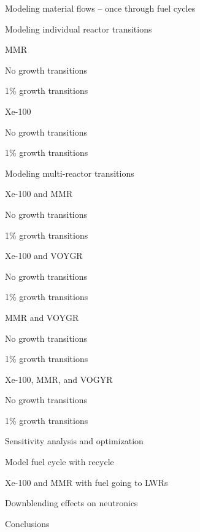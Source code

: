 \documentclass{report}
\begin{document}
\begin{outline}
\item Modeling material flows -- once through fuel cycles
\begin{outline}
    \item Modeling individual reactor transitions
    \begin{outline}
        \item MMR 
        \begin{outline}
            \item No growth transitions
            \item 1\% growth transitions
        \end{outline}
        \item Xe-100
        \begin{outline}
            \item No growth transitions
            \item 1\% growth transitions
        \end{outline}
    \end{outline}
    \item Modeling multi-reactor transitions 
    \begin{outline}
        \item Xe-100 and MMR
        \begin{outline}
            \item No growth transitions
            \item 1\% growth transitions
        \end{outline} 
        \item Xe-100 and VOYGR 
        \begin{outline}
            \item No growth transitions
            \item 1\% growth transitions
        \end{outline}
        \item MMR and VOYGR 
        \begin{outline}
            \item No growth transitions
            \item 1\% growth transitions
        \end{outline}
        \item Xe-100, MMR, and VOGYR 
        \begin{outline}
            \item No growth transitions
            \item 1\% growth transitions
        \end{outline}
    \end{outline}
    \item Sensitivity analysis and optimization
\end{outline}

\item Model fuel cycle with recycle 
\begin{outline}
    \item Xe-100 and MMR with fuel going to LWRs
\end{outline}

\item Downblending effects on neutronics

\item Conclusions
\end{outline}




\end{document}
